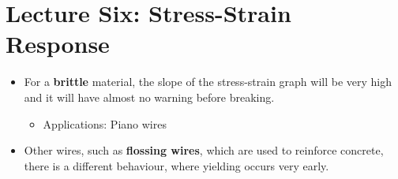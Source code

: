 \section{Lecture Six: Stress-Strain Response}
\begin{itemize}
    \item For a \textbf{brittle} material, the slope of the stress-strain graph will be very high and it will have almost no warning before breaking.
    \begin{itemize}
        \item Applications: Piano wires
    \end{itemize}
    \item Other wires, such as \textbf{flossing wires}, which are used to reinforce concrete, there is a different behaviour, where yielding occurs very early.
    \begin{center}
\end{center}
\end{itemize}
